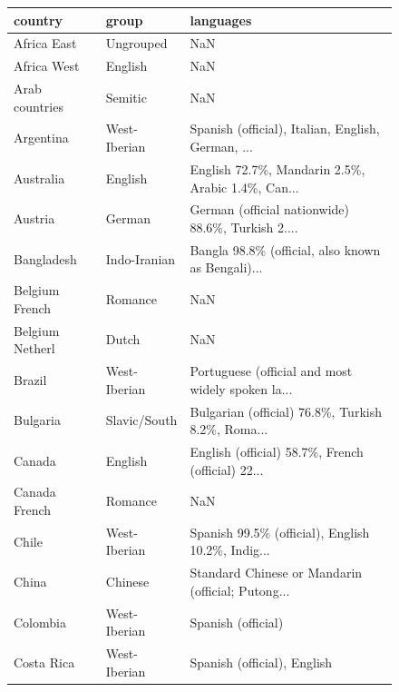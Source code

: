 \documentclass[a4paper,10pt]{article}
\begin{document}
\begin{figure}
\begin{center}
\begin{tabularx}{\textwidth}{llX}
\toprule
country &              group &                                          languages \\
\midrule
Africa East         &          Ungrouped &                                                NaN \\
Africa West         &            English &                                                NaN \\
Arab countries      &            Semitic &                                                NaN \\
Argentina           &       West-Iberian &  Spanish (official), Italian, English, German, ... \\
Australia           &            English &  English 72.7\%, Mandarin 2.5\%, Arabic 1.4\%, Can... \\
Austria             &             German &  German (official nationwide) 88.6\%, Turkish 2.... \\
Bangladesh          &       Indo-Iranian &  Bangla 98.8\% (official, also known as Bengali)... \\
Belgium French      &            Romance &                                                NaN \\
Belgium Netherl     &              Dutch &                                                NaN \\
Brazil              &       West-Iberian &  Portuguese (official and most widely spoken la... \\
Bulgaria            &       Slavic/South &  Bulgarian (official) 76.8\%, Turkish 8.2\%, Roma... \\
Canada              &            English &  English (official) 58.7\%, French (official) 22... \\
Canada French       &            Romance &                                                NaN \\
Chile               &       West-Iberian &  Spanish 99.5\% (official), English 10.2\%, Indig... \\
China               &            Chinese &  Standard Chinese or Mandarin (official; Putong... \\
Colombia            &       West-Iberian &                                 Spanish (official) \\
Costa Rica          &       West-Iberian &                        Spanish (official), English \\

\end{tabularx}
\end{center}
\end{figure}
\end{document}
